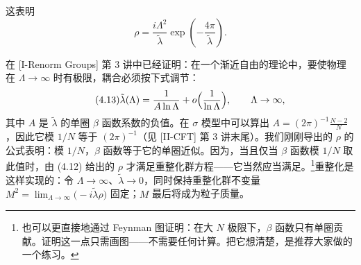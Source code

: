 


这表明
\begin{equation}
  \tag{4.12}
  \label{eq:4-12}
  \rho=\frac{i\Lambda^2}{\tilde\lambda}\exp\left(-\frac{4\pi}{\tilde\lambda}\right).
\end{equation}

在 [I-Renorm Groups] 第 3 讲中已经证明：在一个渐近自由的理论中，要使物理在 $\Lambda\to\infty$ 时有极限，耦合必须按下式调节：
\begin{equation}
  \tag{4.13}
  \label{eq:4-13}
  \tilde\lambda(\Lambda)=\frac{1}{A\ln\Lambda}+o\Bigl(\frac{1}{\ln\Lambda}\Bigr),\qquad \Lambda\to\infty,
\end{equation}
其中 $A$ 是 $\tilde\lambda$ 的单圈 $\beta$ 函数系数的负值。在 $\sigma$ 模型中可以算出 $A=(2\pi)^{-1}\frac{N-2}{N}$，因此它模 $1/N$ 等于 $(2\pi)^{-1}$（见 [II-CFT] 第 3 讲末尾）。我们刚刚导出的 $\rho$ 的公式表明：模 $1/N$，$\beta$ 函数等于它的单圈近似。因为，当且仅当 $\beta$ 函数模 $1/N$ 取此值时，由 (4.12) 给出的 $\rho$ 才满足重整化群方程——它当然应当满足。\footnote{也可以更直接地通过 Feynman 图证明：在大 $N$ 极限下，$\beta$ 函数只有单圈贡献。证明这一点只需画图——不需要任何计算。把它想清楚，是推荐大家做的一个练习。}重整化是这样实现的：令 $\Lambda\to\infty$、$\tilde\lambda\to0$，同时保持重整化群不变量 $M^2=\lim_{\Lambda\to\infty}\bigl(-i\tilde\lambda\rho\bigr)$ 固定；$M$ 最后将成为粒子质量。

